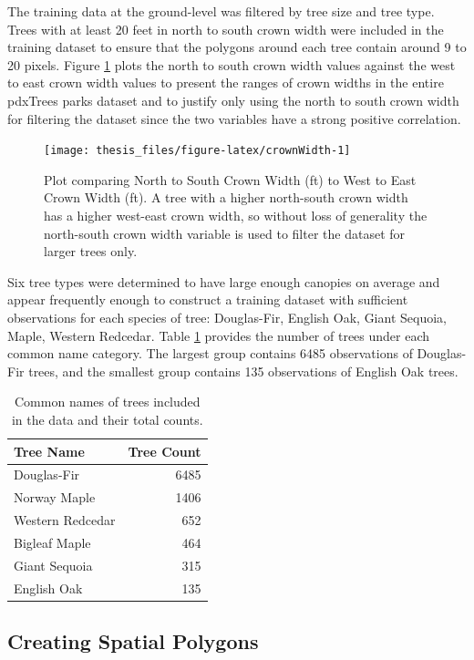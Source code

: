 \documentclass[12pt,twoside]{reedthesis}
\begin{document}
The training data at the ground-level was filtered by tree size and tree type. Trees with at least 20 feet in north to south crown width were included in the training dataset to ensure that the polygons around each tree contain around 9 to 20 pixels. Figure \ref{fig:crownWidth} plots the north to south crown width values against the west to east crown width values to present the ranges of crown widths in the entire pdxTrees parks dataset and to justify only using the north to south crown width for filtering the dataset since the two variables have a strong positive correlation.
\begin{figure}

{\centering \texttt{[image: thesis\_files/figure-latex/crownWidth-1]} 

}

\caption{Plot comparing North to South Crown Width (ft) to West to East Crown Width (ft). A tree with a higher north-south crown width has a higher west-east crown width, so without loss of generality the north-south crown width variable is used to filter the dataset for larger trees only.}\label{fig:crownWidth}
\end{figure}
Six tree types were determined to have large enough canopies on average and appear frequently enough to construct a training dataset with sufficient observations for each species of tree: Douglas-Fir, English Oak, Giant Sequoia, Maple, Western Redcedar. Table \ref{tab:pointsTable} provides the number of trees under each common name category. The largest group contains 6485 observations of Douglas-Fir trees, and the smallest group contains 135 observations of English Oak trees.
\begin{table}

\caption{\label{tab:pointsTable}Common names of trees included in the data and their total counts.}
\centering
\begin{tabular}[t]{l|r}
\hline
Tree Name & Tree Count\\
\hline
Douglas-Fir & 6485\\
\hline
Norway Maple & 1406\\
\hline
Western Redcedar & 652\\
\hline
Bigleaf Maple & 464\\
\hline
Giant Sequoia & 315\\
\hline
English Oak & 135\\
\hline
\end{tabular}
\end{table}
\hypertarget{creating-spatial-polygons}{%
\subsection{Creating Spatial Polygons}\label{creating-spatial-polygons}}
\end{document}
